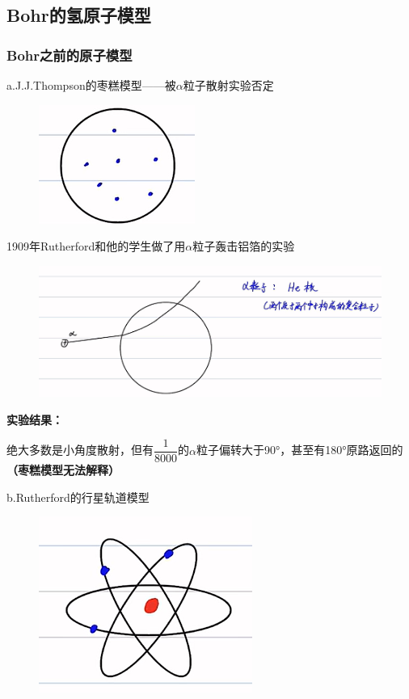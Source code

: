 \documentclass[lang=cn,15pt]{elegantbook}
\begin{document}
\subsection{Bohr的氢原子模型}
\subsubsection{Bohr之前的原子模型}
a.J.J.Thompson的枣糕模型——被$\alpha$粒子散射实验否定
\begin{figure}[H]
	\centering
	\includegraphics[width=0.7\linewidth]{figure/screenshot0010}
\end{figure}
1909年Rutherford和他的学生做了用$\alpha$粒子轰击铝箔的实验

\begin{figure}[H]
	\centering
	\includegraphics[width=0.7\linewidth]{figure/screenshot0011}
\end{figure}

\textbf{实验结果：}

绝大多数是小角度散射，但有$\dfrac{1}{8000}$的$\alpha$粒子偏转大于90°，甚至有180°原路返回的\textbf{（枣糕模型无法解释）}

b.Rutherford的行星轨道模型
\begin{figure}[H]
	\centering
	\includegraphics[width=0.7\linewidth]{figure/screenshot0012}
\end{figure}
\end{document}

